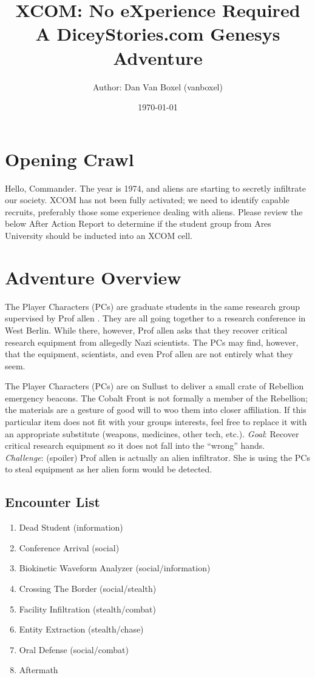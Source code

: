 \documentclass{book}
\title{
    XCOM: No eXperience Required \\
A DiceyStories.com Genesys Adventure\\
}
\author{Author: Dan Van Boxel (vanboxel)}
\date{\today}
\newcommand{\prof}{
    {\color{brown} Prof allen}
}
\begin{document}
\maketitle


\begin{multicols*}{2}
\section{Opening Crawl}

Hello, Commander.  The year is 1974, and aliens are starting to secretly infiltrate our society.  XCOM has not been fully activated; we need to identify capable recruits, preferably those some experience dealing with aliens.  Please review the below After Action Report to determine if the student group from Ares University should be inducted into an XCOM cell.

\section{Adventure Overview }

    The Player Characters (PCs) are graduate students in the same research group supervised by \prof.  They are all going together to a research conference in West Berlin.  While there, however, \prof asks that they recover critical research equipment from allegedly Nazi scientists.  The PCs may find, however, that the equipment, scientists, and even \prof are not entirely what they seem.

    The Player Characters (PCs) are on Sullust to deliver a small crate of Rebellion emergency beacons. The Cobalt Front is not formally a member of the Rebellion; the materials are a gesture of good will to woo them into closer affiliation. If this particular item does not fit with your groups interests, feel free to replace it with an appropriate substitute (weapons, medicines, other tech, etc.).
\emph{Goal}: Recover critical research equipment so it does not fall into the ``wrong'' hands.\\
\emph{Challenge}: (spoiler) \prof is actually an alien infiltrator.  She is using the PCs to steal equipment as her alien form would be detected.\\

\subsection{Encounter List}
\begin{enumerate}
    \item Dead Student (information)
    \item Conference Arrival (social)
    \item Biokinetic Waveform Analyzer (social/information)
    \item Crossing The Border (social/stealth)
    \item Facility Infiltration (stealth/combat)
    \item Entity Extraction (stealth/chase)
    \item Oral Defense (social/combat)
    \item Aftermath
\end{enumerate}


\end{multicols*}
\end{document}
